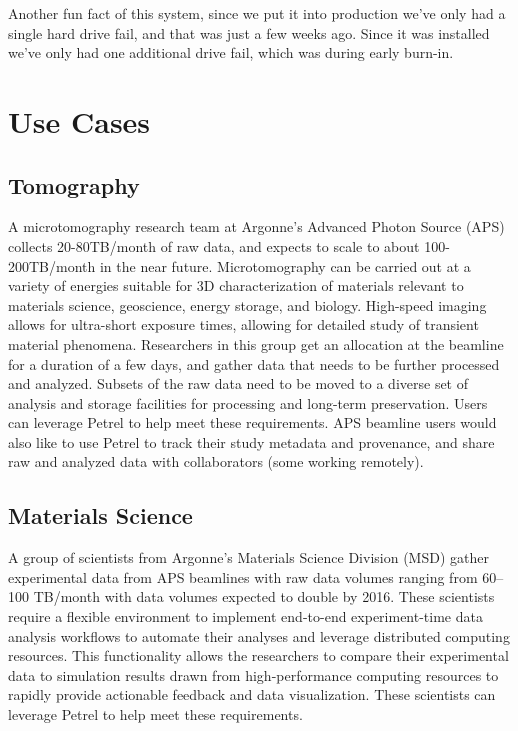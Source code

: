 \documentclass[sigconf]{acmart}
\begin{document}
Another fun fact of this system, since we put it into production we've only had a single hard drive fail, and that was just a few weeks ago. Since it was installed we've only had one additional drive fail, which was during early burn-in.


\section{Use Cases}

\subsection{Tomography}

A microtomography research team at Argonne's Advanced Photon Source (APS) collects 20-80TB/month of raw data, and expects to scale to about 100-200TB/month in the near future. Microtomography can be carried out at a variety of energies suitable for 3D characterization of materials relevant to materials science, geoscience, energy storage, and biology. High-speed imaging allows for ultra-short exposure times, allowing for detailed study of transient material phenomena. Researchers in this group get an allocation at the beamline for a duration of a few days, and gather data that needs to be further processed and analyzed. Subsets of the raw data need to be moved to a diverse set of analysis and storage facilities for processing and long-term preservation. Users can leverage Petrel to help meet these requirements. APS beamline users would also like to use Petrel to track their study metadata and provenance, and share raw and analyzed data with collaborators (some working remotely).



\subsection{Materials Science}

A group of scientists from Argonne's Materials Science Division (MSD) gather experimental data from APS beamlines with raw data volumes ranging from 60--100 TB/month with data volumes expected to double by 2016. These scientists require a flexible environment to implement end-to-end experiment-time data analysis workflows to automate their analyses and leverage distributed computing resources. This functionality allows the researchers to compare their experimental data to simulation results drawn from high-performance computing resources to rapidly provide actionable feedback and data visualization. These scientists can leverage Petrel to help meet these requirements.
\end{document}
